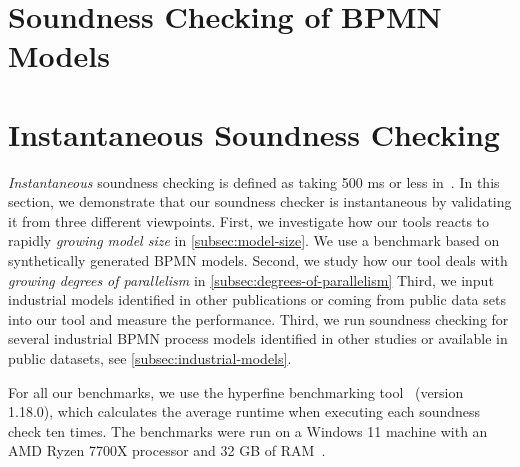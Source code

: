 \documentclass[runningheads]{llncs}
\begin{document}

\cite{corradiniClassificationBPMNCollaborations2018}


\section{Soundness Checking of BPMN Models}


\section{Instantaneous Soundness Checking} \label{sec:instantaneous}
\textit{Instantaneous} soundness checking is defined as taking 500 ms or less in~\cite{fahlandAnalysisDemandInstantaneous2011}.
In this section, we demonstrate that our soundness checker is instantaneous by validating it from three different viewpoints.
First, we investigate how our tools reacts to rapidly \textit{growing model size} in \autoref{subsec:model-size}.
We use a benchmark based on synthetically generated BPMN models.
Second, we study how our tool deals with \textit{growing degrees of parallelism} in \autoref{subsec:degrees-of-parallelism}
Third, we input industrial models identified in other publications or coming from public data sets into our tool and measure the performance.
Third, we run soundness checking for several industrial BPMN process models identified in other studies or available in public datasets, see \autoref{subsec:industrial-models}. %

For all our benchmarks, we use the hyperfine benchmarking tool~\cite{peterHyperfine2023} (version 1.18.0), which calculates the average runtime when executing each soundness check ten times.
The benchmarks were run on a Windows 11 machine with an AMD Ryzen 7700X processor and 32 GB of RAM~\cite{noauthorgivenBPM2024Artifacts2024}.
\end{document}
